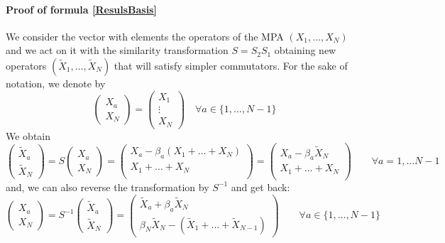 \documentclass[10pt]{article}
\numberwithin{equation}{section}
\numberwithin{equation}{subsection}
\newcommand{\Xt}{\tilde{X}}
\begin{document}
\paragraph{Proof of formula \eqref{ResulsBasis}} 
We consider the vector with elements the operators of the MPA $(X_{1},\ldots,X_{N})$ and we act on it with the similarity transformation $S=S_{2}S_{1}$ obtaining new operators $(\Xt_{1},\ldots,\Xt_{N})$ that will satisfy simpler commutators. 
For the sake of notation, we denote by 
\begin{equation}
    \begin{pmatrix}
		X_{a}\\ 
		X_{N}
	\end{pmatrix}=\begin{pmatrix}
	    X_{1}\\
     \vdots\\
     X_{N}
	\end{pmatrix}\quad \forall a\in \{1,\ldots,N-1\}
\end{equation}
We obtain 
\begin{equation}\label{Xtildes2b}
	\begin{pmatrix}
		\Xt_{a}\\ 
		\Xt_{N}
	\end{pmatrix} =S\begin{pmatrix}
		X_{a}\\X_{N}
	\end{pmatrix}=\begin{pmatrix} 
		X_{a}-\beta_{a}(X_{1}+\ldots+X_{N})\\
				X_{1}+\ldots +X_{N}\\
	\end{pmatrix}=\begin{pmatrix} 
		X_{a}-\beta_{a}\Xt_{N}\\ 
			X_{1}+\ldots +X_{N}\\
	\end{pmatrix}\qquad \forall a=1,\ldots N-1
\end{equation}
and, we can also reverse the transformation by $S^{-1}$ and get back: 
\begin{equation}\label{Xes}
	\begin{pmatrix}
		X_{a}\\
		X_{N} 
	\end{pmatrix} =S^{-1}\begin{pmatrix}
		\widetilde{X}_{a}\\
		\widetilde{X}_{N}
	\end{pmatrix}=\begin{pmatrix}
		\Xt_{a}+\beta_{a}\Xt_{N}\\ 
		\beta_N\Xt_{N}-(\Xt_{1}+\ldots+\Xt_{N-1})
	\end{pmatrix}\qquad\forall a\in \{1,\ldots,N-1\}
\end{equation}
\end{document}
